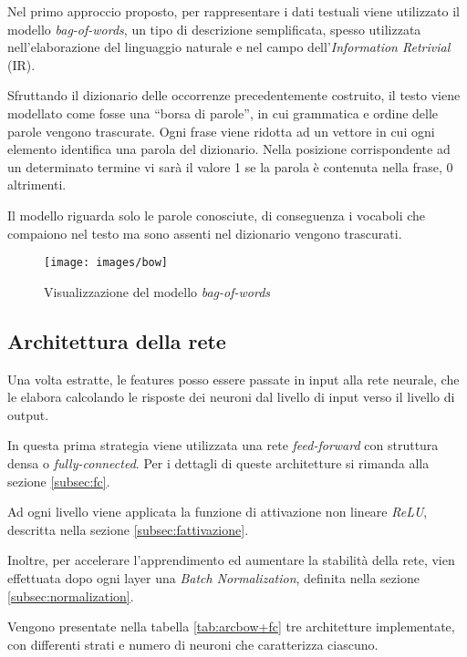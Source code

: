 Nel primo approccio proposto, per rappresentare i dati testuali viene utilizzato il modello \emph{bag-of-words}, un tipo di descrizione semplificata, spesso utilizzata nell'elaborazione del linguaggio naturale e nel campo dell'\emph{Information Retrivial} (IR). 

Sfruttando il dizionario delle occorrenze precedentemente costruito, il testo viene modellato  come fosse una ``borsa di parole'', in cui grammatica e ordine delle parole vengono trascurate.
Ogni frase viene ridotta ad un vettore in cui ogni elemento identifica una parola del dizionario. Nella posizione corrispondente ad un determinato termine vi sarà il valore \num{1} se la parola è contenuta nella frase, \num{0} altrimenti.

Il modello riguarda solo le parole conosciute, di conseguenza i vocaboli che compaiono nel testo ma sono assenti nel dizionario vengono trascurati.

\begin{figure}[H]
	\centering
	{\texttt{[image: images/bow]}}
	\caption{Visualizzazione del modello \emph{bag-of-words}}
	\label{fig:bow}
\end{figure}

\subsection{Architettura della rete}
\label{subsec:modelli1}

Una volta estratte, le features posso essere passate in input alla rete neurale, che le elabora calcolando le risposte dei neuroni dal livello di input verso il livello di output.

In questa prima strategia viene utilizzata una rete \emph{feed-forward} con struttura densa o \emph{fully-connected}. Per i dettagli di queste architetture si rimanda alla sezione \ref{subsec:fc}.

Ad ogni livello viene applicata la funzione di attivazione non lineare \emph{ReLU}, descritta nella sezione \ref{subsec:fattivazione}.

Inoltre, per accelerare l'apprendimento ed aumentare la stabilità della rete, vien effettuata dopo ogni layer una \emph{Batch Normalization}, definita nella sezione \ref{subsec:normalization}. 

Vengono presentate nella tabella \ref{tab:arcbow+fc} tre architetture implementate, con differenti strati e numero di neuroni che caratterizza ciascuno.


